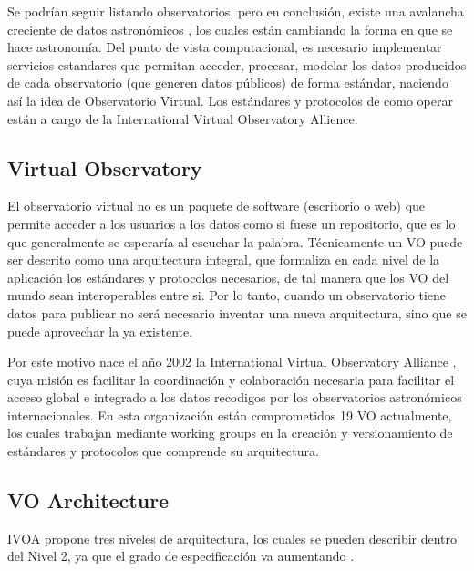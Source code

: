 Se podrían seguir listando observatorios, pero en conclusión, existe una
avalancha creciente de datos astronómicos \cite{kborne}, los cuales están cambiando la forma
en que se hace astronomía. Del punto de vista computacional, es necesario
implementar servicios estandares que permitan acceder, procesar, modelar los
datos producidos de cada observatorio (que generen datos públicos) de forma
estándar, naciendo así la idea de Observatorio Virtual. Los estándares y
protocolos de como operar están a cargo de la International Virtual Observatory
Allience. 

\subsection{Virtual Observatory}
El observatorio virtual no es un paquete de software (escritorio o web) que
permite acceder a los usuarios a los datos como si fuese un repositorio, que es
lo que generalmente se esperaría al escuchar la palabra. Técnicamente un VO
puede ser descrito como una arquitectura integral, que formaliza en cada
nivel de la aplicación los estándares y protocolos necesarios, de tal manera
que los VO del mundo sean interoperables entre si. Por lo tanto, cuando un
observatorio tiene datos para publicar no será necesario inventar una nueva
arquitectura, sino que se puede aprovechar la ya existente.

Por este motivo nace el año 2002 la International Virtual Observatory Alliance
\cite{ivoa}, cuya misión es facilitar la coordinación y colaboración necesaria
para facilitar el acceso global e integrado a los datos recodigos por los
observatorios astronómicos internacionales. En esta organización están
comprometidos 19 VO actualmente, los cuales trabajan mediante working groups en
la creación y versionamiento de estándares y protocolos que comprende su
arquitectura.

\subsection{VO Architecture}

IVOA propone tres niveles de arquitectura, los cuales se pueden describir
dentro del Nivel 2, ya que el grado de especificación va aumentando \cite{arch}.



